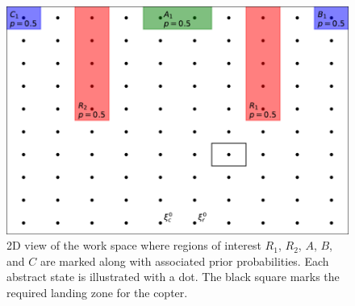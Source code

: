 \documentclass[draft,conference]{IEEEtran}
\begin{document}
\begin{figure}
  \begin{center}
    \includegraphics[width=0.6\columnwidth]{2figs/arena.pdf}
  \end{center}
  \caption{2D view of the work space where regions of interest $R_1$, $R_2$, $A$, $B$, and $C$ are marked along with associated prior probabilities. Each abstract state is illustrated with a dot. The black square marks the required landing zone for the copter.}
  \label{fig:workspace1}
\end{figure}

\end{document}
